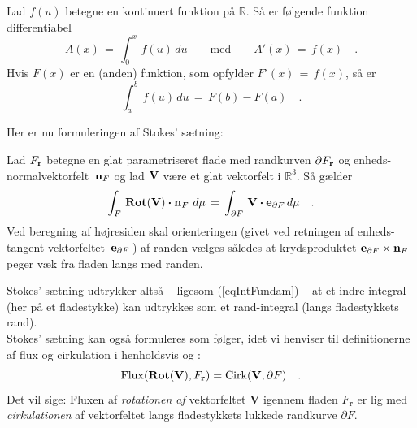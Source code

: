 \begin{theorem}  \label{thmFundamCalc}
Lad $f(u)$ betegne en kontinuert funktion på
$\mathbb{R}$. Så er følgende funktion
differentiabel
\begin{equation} \label{eqAP}
A(x) \, = \,  \int_{0}^{x}\,f(u)\, du \qquad
\textrm{med}\qquad A'(x) \, = \, f(x) \quad .
\end{equation}
Hvis $F(x)$ er en (anden) funktion, som  opfylder
$F'(x) \, = \, f(x)$, så er
\begin{equation} \label{eqIntFundam}
\int_{a}^{b}\,f(u)\,du \, = \, F(b) - F(a) \quad
.
\end{equation}
\end{theorem}

Her er nu formuleringen af {Stokes' sætning}:

\begin{theorem} \label{thmStokes}
Lad $F_{\bf{r}}$ betegne en glat parametriseret flade
med randkurven $\partial F_{\bf{r}}$ og
en\-heds\--nor\-mal\-vek\-tor\-felt
$\,{\bf{n}}_{F}$ og lad ${\bf{V}}$ være et glat
vektorfelt i $\mathbb{R}^{3}$. Så gælder
\begin{equation} \label{eqStokes}
\int_{F}\, \operatorname{\mathbf{Rot}}({\bf{V}})\bm{\cdot} {\bf{n}}_{F} \,
\,d\mu \, = \, \int_{\partial F} \, {\bf{V}}
\bm{\cdot} {\bf{e}}_{\partial F} \, d\mu \quad .
\end{equation}
Ved beregning af højresiden skal orienteringen
(givet ved retningen af enheds-tangent-vektorfeltet $\, {\bf{e}}_{\partial F}\,$) af randen vælges
således at krydsproduktet  ${\bf{e}}_{\partial F}
\times {\bf{n}}_{F}$ peger væk fra fladen langs
med randen.
\end{theorem}

\begin{think}
Stokes' sætning udtrykker altså -- ligesom (\ref{eqIntFundam}) -- at et indre integral (her på et fladestykke) kan udtrykkes som et rand-integral (langs fladestykkets rand). \\
Stokes' sætning kan også formuleres som følger, idet vi henviser til
definitionerne af flux og cirkulation i henholdsvis  og :
\begin{equation}
\operatorname{Flux}(\operatorname{\mathbf{Rot}}(\mathbf{V}), F_{\mathbf{r}}) = \operatorname{Cirk}(\mathbf{V}, \partial F) \quad .
\end{equation}
Det vil sige: Fluxen af \emph{rotationen af} vektorfeltet $\mathbf{V}$ igennem fladen $F_{\mathbf{r}}$ er lig med \emph{cirkulationen} af vektorfeltet
langs fladestykkets lukkede randkurve  $\partial F$.
\end{think}

